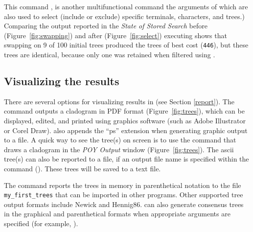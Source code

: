 {This command , is another multifunctional command the arguments of which are also used to select (include or exclude) specific terminals, characters, and trees.) Comparing the output reported in the \emph{State of Stored Search} before (Figure~\ref{fig:swapping}) and after (Figure~\ref{fig:select}) executing  shows that swapping on 9 of 100 initial trees produced the trees of best cost (\texttt{446}), but these trees are identical, because only one was retained when filtered using .

\subsection{Visualizing the results}

There are several options for visualizing results in \poy (see Section \ref{report}). The command
 outputs a cladogram in PDF format (Figure~\ref{fig:trees}), which can be displayed, edited, and printed using graphics software (such as Adobe Illustrator or Corel Draw). \poy also appends the ``ps'' extension when generating graphic output to a file. A quick way to see the tree(s) on screen is to use the command  that draws a cladogram in the \emph{POY Output} window (Figure~\ref{fig:trees}). The ascii tree(s) can also be reported to a file, if an output file name is specified within the command ().  These trees will be saved to a text file.

The command  reports the trees in memory in parenthetical notation to the file \texttt{my\_first\_trees} that can be imported in other programs. Other supported tree output formats include Newick and Hennig86.  can also generate consensus trees in the graphical and parenthetical formats when appropriate arguments are specified (for example, ).

}
